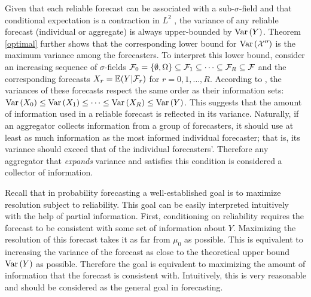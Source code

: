 \documentclass[12pt]{article}
\newcommand{\E}{\mathbb{E}}
\theoremstyle{definition}
\theoremstyle{definition}
\def\F{{\cal F}}
\def\E{{\mathbb E}}
\def\Var{{\rm Var}\,}
\begin{document}
Given that each reliable forecast can be associated with a sub-$\sigma$-field and  that conditional expectation is a contraction in $L^2$ \citep[Theorem 5.1.4.]{durrett2010probability}, the variance of any reliable forecast (individual or aggregate) is always upper-bounded by $\Var(Y)$. 
Theorem \ref{optimal} further shows that the corresponding lower bound for $\Var(\mathcal{X}'')$ is the maximum variance among the forecasters. To interpret this lower bound, consider 
an increasing sequence of $\sigma$-fields $\F_0 = \{\emptyset, \Omega\} \subseteq \F_1 \subseteq \dots \subseteq \F_R \subseteq \F$ and the corresponding forecasts $X_r = \E(Y|\F_r)$ for $r = 0,1, \dots, R$. According to \citet[Proposition 2.1]{satopaamodeling2}, the variances of these forecasts respect the same order as their information sets: $\Var(X_0) \leq \Var(X_1) \leq \dots \leq \Var(X_R) \leq \Var(Y)$. This suggests that the amount of information used in a reliable forecast is reflected in its variance. Naturally, if an aggregator collects information from a group of forecasters, it should use at least as much information as the most informed individual forecaster; that is, its variance should exceed that of the individual forecasters'. Therefore any aggregator that \textit{expands} variance and satisfies this condition is
considered a collector of information. 


Recall that in probability forecasting a well-established goal is to maximize resolution subject to reliability. This goal can be easily interpreted intuitively with the help of partial information. First, conditioning on reliability requires the forecast to be consistent with some set of information about $Y$. Maximizing the resolution of this forecast takes it as far from $\mu_0$ as possible. This is equivalent to increasing the variance of the forecast as close to the theoretical upper bound $\Var(Y)$ as possible. Therefore the goal is equivalent to maximizing the amount of information that the forecast is consistent with. Intuitively, this is very reasonable and should be considered as the general goal in forecasting.
\end{document}
